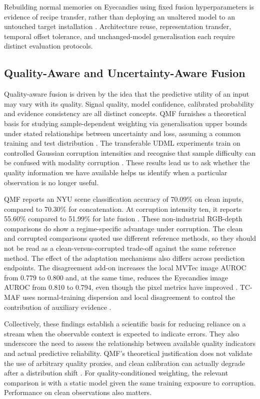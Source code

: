 Rebuilding normal memories on Eyecandies using fixed fusion hyperparameters is evidence of recipe
transfer, rather than deploying an unaltered model to an untouched target installation
\parencite{P026,P033}.
Architecture reuse, representation transfer, temporal offset tolerance, and unchanged-model generalisation each require distinct evaluation protocols.

\subsection{Quality-Aware and Uncertainty-Aware Fusion}

Quality-aware fusion is driven by the idea that the predictive utility of an input may vary with its
quality. Signal quality, model confidence, calibrated probability and evidence consistency are all
distinct concepts.
QMF furnishes a theoretical basis for studying sample-dependent weighting via generalisation upper
bounds under stated relationships between uncertainty and loss, assuming a common training and test
distribution \parencite[Sections~3.1--3.2]{Zhang2023QMF}.
The transferable UDML experiments train on controlled Gaussian corruption intensities and recognise
that sample difficulty can be confused with modality corruption \parencite[pp.~4--5, 9]{P022}.
These results lead us to ask whether the quality information we have available helps us identify
when a particular observation is no longer useful.

QMF reports an NYU scene classification accuracy of 70.09\% on clean inputs, compared to 70.30\% for
concatenation. At corruption intensity ten, it reports 55.60\% compared to 51.99\% for late fusion
\parencite[Table~1]{Zhang2023QMF}.
These non-industrial RGB-depth comparisons do show a regime-specific advantage under corruption. The
clean and corrupted comparisons quoted use different reference methods, so they should not be read
as a clean-versus-corrupted trade-off against the same reference method.
The effect of the adaptation mechanisms also differs across prediction endpoints. The disagreement
add-on increases the local MVTec image AUROC from 0.779 to 0.800 and, at the same time, reduces the
Eyecandies image AUROC from 0.810 to 0.794, even though the pixel metrics have improved \parencite[Tables~4--5]{P033}.
TC-MAF uses normal-training dispersion and local disagreement to control the contribution of
auxiliary evidence \parencite{P026}.

Collectively, these findings establish a scientific basis for reducing reliance on a stream when the
observable context is expected to indicate errors. They also underscore the need to assess the
relationship between available quality indicators and actual predictive reliability.
QMF's theoretical justification does not validate the use of arbitrary quality proxies, and clean
calibration can actually degrade after a distribution shift \parencite{Zhang2023QMF,P008}.
For quality-conditioned weighting, the relevant comparison is with a static model given the same training exposure to corruption. Performance on clean observations also matters.

